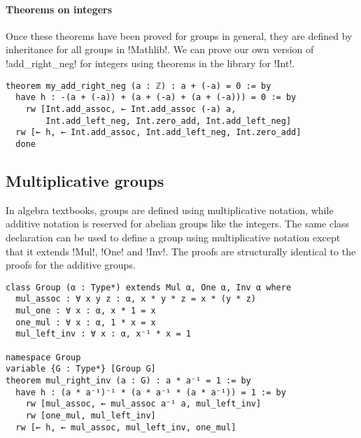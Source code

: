 \paragraph{Theorems on integers}
Once these theorems have been proved for groups in general, they are defined by inheritance for all groups in !Mathlib!. We can prove our own version of !add_right_neg! for integers using theorems in the library for !Int!.
\begin{Verbatim}
theorem my_add_right_neg (a : ℤ) : a + (-a) = 0 := by
  have h : -(a + (-a)) + (a + (-a) + (a + (-a))) = 0 := by
    rw [Int.add_assoc, ← Int.add_assoc (-a) a,
        Int.add_left_neg, Int.zero_add, Int.add_left_neg]
  rw [← h, ← Int.add_assoc, Int.add_left_neg, Int.zero_add]
  done
\end{Verbatim}

\subsection{Multiplicative groups}

In algebra textbooks, groups are defined using multiplicative notation, while additive notation is reserved for abelian groups like the integers. The same class declaration can be used to define a group using multiplicative notation except that it extends !Mul!, !One! and !Inv!. The proofs are structurally identical to the proofs for the additive groups.

\begin{Verbatim}
class Group (α : Type*) extends Mul α, One α, Inv α where
  mul_assoc : ∀ x y z : α, x * y * z = x * (y * z)
  mul_one : ∀ x : α, x * 1 = x
  one_mul : ∀ x : α, 1 * x = x
  mul_left_inv : ∀ x : α, x⁻¹ * x = 1

namespace Group
variable {G : Type*} [Group G]
theorem mul_right_inv (a : G) : a * a⁻¹ = 1 := by
  have h : (a * a⁻¹)⁻¹ * (a * a⁻¹ * (a * a⁻¹)) = 1 := by
    rw [mul_assoc, ← mul_assoc a⁻¹ a, mul_left_inv]
    rw [one_mul, mul_left_inv]
  rw [← h, ← mul_assoc, mul_left_inv, one_mul]
\end{Verbatim}
